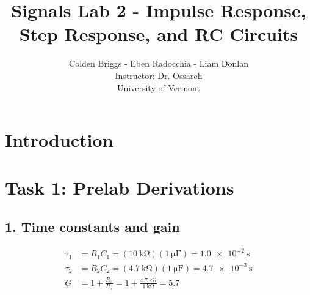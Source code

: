 \documentclass[12pt]{article}
\title{\textbf{Signals Lab 2 - Impulse Response, Step Response, and RC Circuits}}
\author{Colden Briggs - Eben Radocchia - Liam Donlan\\Instructor: Dr. Ossareh\\ University of Vermont}
\begin{document}
\maketitle
\newpage
\tableofcontents
\newpage

\section*{Introduction}
\newpage
\section*{Task 1: Prelab Derivations}

\subsection*{1. Time constants and gain}
\begin{align*}
\tau_1 &= R_1C_1 = (\SI{10}{\kilo\ohm})(\SI{1}{\micro\farad}) = \SI{1.0e-2}{\second} \\
\tau_2 &= R_2C_2 = (\SI{4.7}{\kilo\ohm})(\SI{1}{\micro\farad}) = \SI{4.7e-3}{\second} \\
G &= 1 + \frac{R_5}{R_4} = 1 + \frac{\SI{4.7}{\kilo\ohm}}{\SI{1}{\kilo\ohm}} = 5.7
\end{align*}
\end{document}
